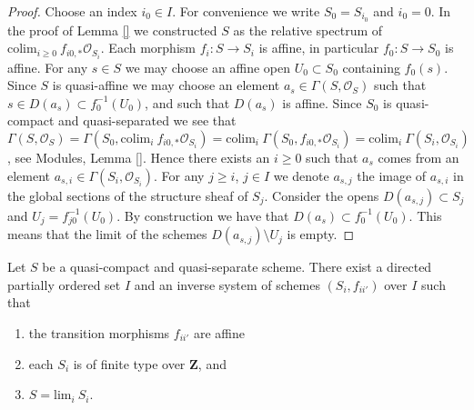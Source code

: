 \begin{proof}
Choose an index $i_0 \in I$. For convenience we write $S_0 = S_{i_0}$ and
$i_0 = 0$. In the proof of Lemma \ref{} we constructed
$S$ as the relative spectrum of
$\text{colim}_{i \geq 0}\ f_{i0,*}\mathcal{O}_{S_i}$.
Each morphism $f_i : S \to S_i$ is affine, in particular $f_0 : S \to S_0$
is affine.
For any $s \in S$ we may choose an affine open
$U_0 \subset S_0$ containing $f_0(s)$. Since $S$ is quasi-affine
we may choose an element $a_s \in \Gamma(S, \mathcal{O}_S)$ such
that $s \in D(a_s) \subset f_0^{-1}(U_0)$, and such that
$D(a_s)$ is affine.
Since $S_0$ is quasi-compact and quasi-separated we see that
$\Gamma(S, \mathcal{O}_S) = 
\Gamma(S_0, \text{colim}_i\ f_{i0,*}\mathcal{O}_{S_i}) =
\text{colim}_i\ \Gamma(S_0, f_{i0,*}\mathcal{O}_{S_i}) =
\text{colim}_i\ \Gamma(S_i, \mathcal{O}_{S_i})$,
see Modules, Lemma \ref{}.
Hence there exists an $i \geq 0$ such that $a_s$
comes from an element $a_{s, i} \in \Gamma(S_i, \mathcal{O}_{S_i})$.
For any $j \geq i$, $j \in I$ we denote $a_{s, j}$
the image of $a_{s, i}$ in the global sections of the
structure sheaf of $S_j$.
Consider the opens $D(a_{s, j}) \subset S_j$
and $U_j = f_{j0}^{-1}(U_0)$. By construction we have that
$D(a_s) \subset f_0^{-1}(U_0)$.
This means that the limit of the schemes
$D(a_{s,j}) \setminus U_j$ is empty.






\end{proof}



\begin{lemma}
\label{lemma-approximate}
Let $S$ be a quasi-compact and quasi-separate scheme.
There exist a directed partially ordered set $I$
and an inverse system of schemes $(S_i, f_{ii'})$ over $I$
such that
\begin{enumerate}
\item the transition morphisms $f_{ii'}$ are affine
\item each $S_i$ is of finite type over $\mathbf{Z}$, and
\item $S = \text{lim}_i\ S_i$.
\end{enumerate}
\end{lemma}

